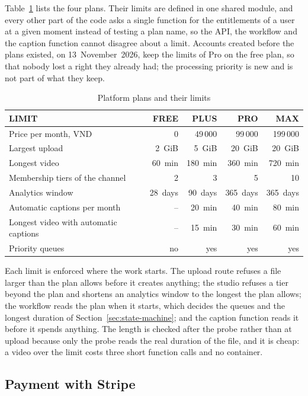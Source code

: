 Table~\ref{tab:plans} lists the four plans. Their limits are defined in one shared module, and every
other part of the code asks a single function for the entitlements of a user at a given moment
instead of testing a plan name, so the API, the workflow and the caption function cannot disagree
about a limit. Accounts created before the plans existed, on 13~November~2026, keep the limits of Pro
on the free plan, so that nobody lost a right they already had; the processing priority is new and
is not part of what they keep.

\begin{table}[H]
\centering
\caption{Platform plans and their limits}
\label{tab:plans}
\small
\begin{tabularx}{\textwidth}{>{\raggedright\arraybackslash}X r r r r}
\toprule
\textbf{LIMIT} & \textbf{FREE} & \textbf{PLUS} & \textbf{PRO} & \textbf{MAX} \\
\midrule
Price per month, VND & 0 & 49\,000 & 99\,000 & 199\,000 \\
Largest upload & 2~GiB & 5~GiB & 20~GiB & 20~GiB \\
Longest video & 60~min & 180~min & 360~min & 720~min \\
Membership tiers of the channel & 2 & 3 & 5 & 10 \\
Analytics window & 28~days & 90~days & 365~days & 365~days \\
Automatic captions per month & -- & 20~min & 40~min & 80~min \\
Longest video with automatic captions & -- & 15~min & 30~min & 60~min \\
Priority queues & no & yes & yes & yes \\
\bottomrule
\end{tabularx}
\end{table}

Each limit is enforced where the work starts. The upload route refuses a file larger than the plan
allows before it creates anything; the studio refuses a tier beyond the plan and shortens an
analytics window to the longest the plan allows; the workflow reads the plan when it starts, which decides the queues and the longest duration
of Section~\ref{sec:state-machine}; and the caption function reads it before it spends anything. The
length is checked after the probe rather than at upload because only the probe reads the real
duration of the file, and it is cheap: a video over the limit costs three short function calls and
no container.

\subsection{Payment with Stripe}
\label{sec:payment-design}

